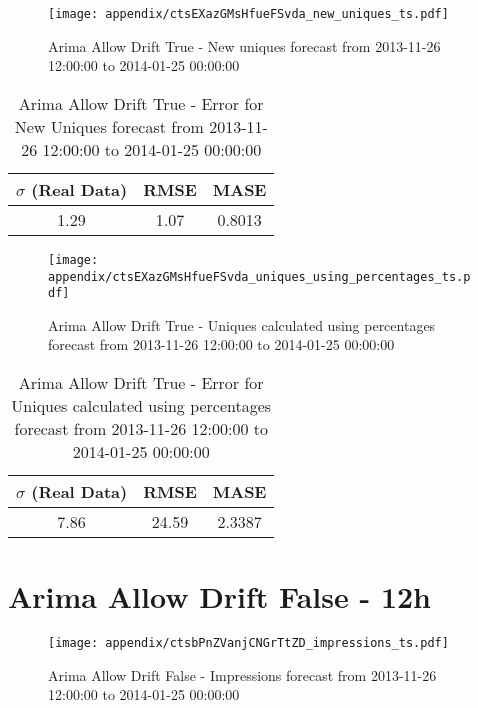 \begin{figure}[H] \begin{center} \leavevmode
\texttt{[image: appendix/ctsEXazGMsHfueFSvda\_new\_uniques\_ts.pdf]} \caption[]{
Arima Allow Drift True - New uniques forecast from 2013-11-26 12:00:00 to 2014-01-25 00:00:00} \label{fig:appendix/ctsEXazGMsHfueFSvda_new_uniques_ts.pdf} \end{center}
\end{figure}

\begin{table}[H]
\centering
\footnotesize
\begin{tabular}{ccc}
$\sigma$ (Real Data) & RMSE & MASE   \\ \hline
1.29 & 1.07 & 0.8013 \\
\end{tabular}

\vspace{0.5cm}

\caption[]{
Arima Allow Drift True - Error for New Uniques forecast from 2013-11-26 12:00:00 to 2014-01-25 00:00:00}
\end{table}

\begin{figure}[H] \begin{center} \leavevmode
\texttt{[image: appendix/ctsEXazGMsHfueFSvda\_uniques\_using\_percentages\_ts.pdf]} \caption[]{
Arima Allow Drift True - Uniques calculated using percentages forecast from 2013-11-26 12:00:00 to 2014-01-25 00:00:00} \label{fig:appendix/ctsEXazGMsHfueFSvda_uniques_using_percentages_ts.pdf} \end{center}
\end{figure}

\begin{table}[H]
\centering
\footnotesize
\begin{tabular}{ccc}
$\sigma$ (Real Data) & RMSE & MASE   \\ \hline
7.86 & 24.59 & 2.3387 \\
\end{tabular}

\vspace{0.5cm}

\caption[]{
Arima Allow Drift True - Error for Uniques calculated using percentages forecast from 2013-11-26 12:00:00 to 2014-01-25 00:00:00}
\end{table}

\section{Arima Allow Drift False - 12h}
\begin{figure}[H] \begin{center} \leavevmode
\texttt{[image: appendix/ctsbPnZVanjCNGrTtZD\_impressions\_ts.pdf]} \caption[]{
Arima Allow Drift False - Impressions forecast from 2013-11-26 12:00:00 to 2014-01-25 00:00:00} \label{fig:appendix/ctsbPnZVanjCNGrTtZD_impressions_ts.pdf} \end{center}
\end{figure}

